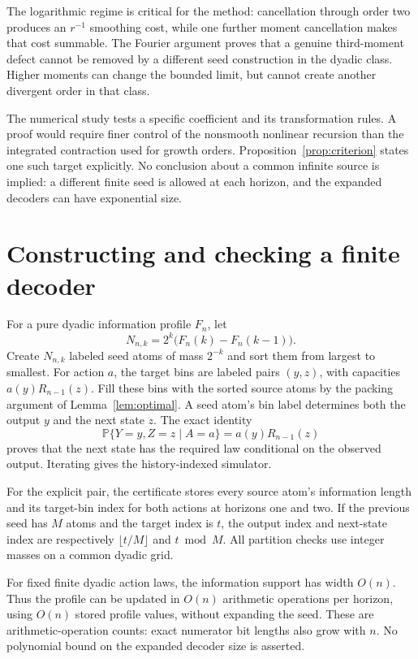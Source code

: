 \documentclass[11pt,a4paper]{article}
\numberwithin{equation}{section}
\newcommand{\Prb}{\mathbb P}
\begin{document}
The logarithmic regime is critical for the method: cancellation through
order two produces an $r^{-1}$ smoothing cost, while one further moment
cancellation makes that cost summable. The Fourier argument proves that
a genuine third-moment defect cannot be removed by a different seed
construction in the dyadic class. Higher moments can change the bounded
limit, but cannot create another divergent order in that class.

The numerical study tests a specific coefficient and its transformation
rules. A proof would require finer control of the nonsmooth nonlinear
recursion than the integrated contraction used for growth orders.
Proposition~\ref{prop:criterion} states one such target explicitly.
No conclusion about a common infinite source is implied: a different
finite seed is allowed at each horizon, and the expanded decoders can
have exponential size.

\appendix
\section{Constructing and checking a finite decoder}\label{app:decoder}
For a pure dyadic information profile $F_n$, let
\[
N_{n,k}=2^k\bigl(F_n(k)-F_n(k-1)\bigr).
\]
Create $N_{n,k}$ labeled seed atoms of mass $2^{-k}$ and sort them from
largest to smallest. For action $a$, the target bins are labeled pairs
$(y,z)$, with capacities $a(y)R_{n-1}(z)$. Fill these bins with the sorted
source atoms by the packing argument of Lemma~\ref{lem:optimal}. A seed
atom's bin label determines both the output $y$ and the next state $z$.
The exact identity
\[
\Prb\{Y=y,Z=z\mid A=a\}=a(y)R_{n-1}(z)
\]
proves that the next state has the required law conditional on the
observed output. Iterating gives the history-indexed simulator.

For the explicit pair, the certificate stores every source atom's
information length and its target-bin index for both actions at horizons
one and two. If the previous seed has $M$ atoms and the target index is
$t$, the output index and next-state index are respectively
$\lfloor t/M\rfloor$ and $t\bmod M$. All partition checks use integer
masses on a common dyadic grid.

For fixed finite dyadic action laws, the information support has width
$O(n)$. Thus the profile can be updated in $O(n)$ arithmetic operations
per horizon, using $O(n)$ stored profile values, without expanding the
seed. These are arithmetic-operation counts: exact numerator bit lengths
also grow with $n$. No polynomial bound on the expanded decoder size is
asserted.
\end{document}
